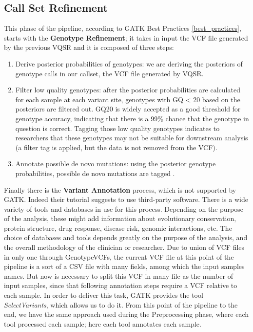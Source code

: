 \subsection{Call Set Refinement}
This phase of the pipeline, according to GATK Best Practices \ref{best_practices}, starts with the \textbf{Genotype Refinement}; it takes in input the VCF file generated by the previous VQSR and it is composed of three steps:
\begin{enumerate}
\item Derive posterior probabilities of genotypes: we are deriving the posteriors of genotype calls in our callset, the VCF file generated by VQSR.
\item Filter low quality genotypes: after the posterior probabilities are calculated for each sample at each variant site, genotypes with GQ < 20 based on the posteriors are filtered out. GQ20 is widely accepted as a good threshold for genotype accuracy, indicating that there is a 99\% chance that the genotype in question is correct. Tagging those low quality genotypes indicates to researchers that these genotypes may not be suitable for downstream analysis (a filter tag is applied, but the data is not removed from the VCF).
\item Annotate possible de novo mutations: using the posterior genotype probabilities, possible de novo mutations are tagged \cite{GenotypeRefinement}.
\end{enumerate}
Finally there is the \textbf{Variant Annotation} process, which is not supported by GATK. Indeed their tutorial suggests to use third-party software. There is a wide variety of tools and databases in use for this process. Depending on the purpose of the analysis, these might add information about evolutionary conservation, protein structure, drug response, disease risk, genomic interactions, etc. The choice of databases and tools depends greatly on the purpose of the analysis, and the overall methodology of the clinician or researcher.\newline
Due to union of VCF files in only one through GenotypeVCFs, the current VCF file at this point of the pipeline is a sort of a CSV file with many fields, among which the input samples names. But now is necessary to split this VCF in many file as the number of input samples, since that following annotation steps require a VCF relative to each sample. In order to deliver this task, GATK provides the tool \textit{SelectVariants}, which allows us to do it. From this point of the pipeline to the end, we have the same approach used during the Preprocessing phase, where each tool processed each sample; here each tool annotates each sample.
